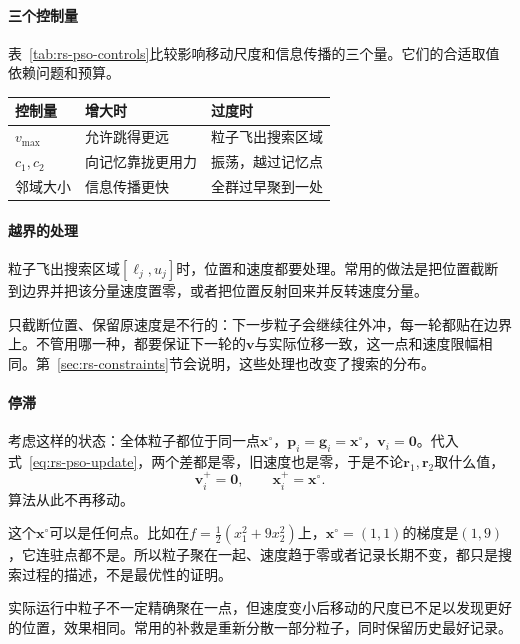 \paragraph{三个控制量}
表~\ref{tab:rs-pso-controls}比较影响移动尺度和信息传播的三个量。它们的合适取值依赖问题和预算。

\begin{BookInlineTable}
 \centering
 \caption{粒子群的三个控制量。}
 \label{tab:rs-pso-controls}
 \begin{tabular}{lll}
  \toprule
  控制量 & 增大时 & 过度时 \\
  \midrule
  $v_{\max}$ & 允许跳得更远 & 粒子飞出搜索区域 \\
  $c_1,c_2$ & 向记忆靠拢更用力 & 振荡，越过记忆点 \\
  邻域大小 & 信息传播更快 & 全群过早聚到一处 \\
  \bottomrule
 \end{tabular}
\end{BookInlineTable}

\paragraph{越界的处理}
粒子飞出搜索区域$[\ell_j,u_j]$时，位置和速度都要处理。常用的做法是把位置截断到边界并把该分量速度置零，或者把位置反射回来并反转速度分量。

只截断位置、保留原速度是不行的：下一步粒子会继续往外冲，每一轮都贴在边界上。不管用哪一种，都要保证下一轮的$\bm{v}$与实际位移一致，这一点和速度限幅相同。第~\ref{sec:rs-constraints}节会说明，这些处理也改变了搜索的分布。

\paragraph{停滞}
考虑这样的状态：全体粒子都位于同一点$\bm{x}^\circ$，$\bm{p}_i=\bm{g}_i=\bm{x}^\circ$，$\bm{v}_i=\bm{0}$。代入式~\eqref{eq:rs-pso-update}，两个差都是零，旧速度也是零，于是不论$\bm{r}_1,\bm{r}_2$取什么值，
\[
 \bm{v}_i^{+}=\bm{0},\qquad\bm{x}_i^{+}=\bm{x}^\circ.
\]
算法从此不再移动。

这个$\bm{x}^\circ$可以是任何点。比如在$f=\tfrac12(x_1^2+9x_2^2)$上，$\bm{x}^\circ=(1,1)$的梯度是$(1,9)$，它连驻点都不是。所以粒子聚在一起、速度趋于零或者记录长期不变，都只是搜索过程的描述，不是最优性的证明。

实际运行中粒子不一定精确聚在一点，但速度变小后移动的尺度已不足以发现更好的位置，效果相同。常用的补救是重新分散一部分粒子，同时保留历史最好记录。
